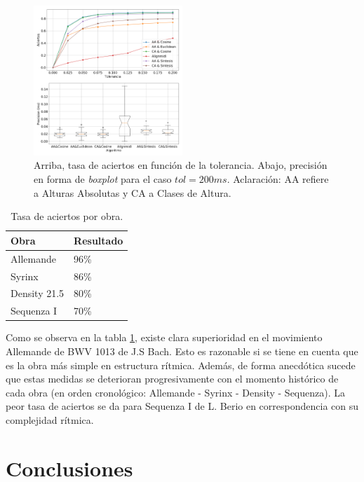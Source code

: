 \documentclass
  [ams,pdfout]%
	{aeslac}
\begin{document}
\begin{figure}[h!]
\begin{center}
\includegraphics[width=0.5\textwidth]{imagenes/comparacion} 	
\caption{Arriba, tasa de aciertos en función de la tolerancia. Abajo, precisión en forma de \textit{boxplot} para el caso $tol=200ms$. Aclaración: AA refiere a Alturas Absolutas y CA a Clases de Altura.}
\label{fig:comparacion}
\end{center}
\end{figure}

\begin{table}[!ht]
\caption{Tasa de aciertos por obra.}
\label{tab:por_obra}
\vspace*{10pt}
\centering
\small
\begin{tabular}{ll}
\textbf{Obra}	&	\textbf{Resultado}\\ \hline
Allemande     & 96\%   \\
Syrinx & 86\%   \\
Density 21.5 & 80\%   \\
Sequenza I & 70\%   \\
\end{tabular}
\end{table}

Como se observa en la tabla \ref{tab:por_obra}, existe clara superioridad en el movimiento Allemande de BWV 1013 de J.S Bach. Esto es razonable si se tiene en cuenta que es la obra más simple en estructura rítmica. Además, de forma anecdótica sucede que estas medidas se deterioran progresivamente con el momento histórico de cada obra (en orden cronológico: Allemande - Syrinx - Density - Sequenza). La peor tasa de aciertos se da para Sequenza I de L. Berio en correspondencia con su complejidad rítmica.

\section{Conclusiones}
\end{document}
